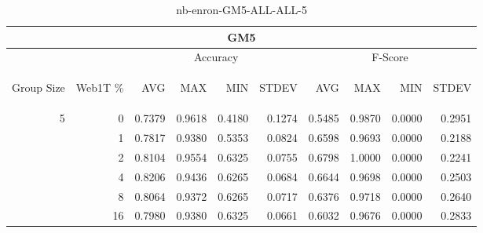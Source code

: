 \begin{center}
\begin{table}[htbp]
\begin{tabular}{ | r | r | r | r | r | r | r | r | r | r |}
\hline
\multicolumn{10}{|c|}{GM5}\\
\hline
 & & \multicolumn{4}{|c|}{Accuracy} & \multicolumn{4}{|c|}{F-Score}\\ \cline{3-10}
\begin{sideways}Group Size\end{sideways} & \begin{sideways}Web1T \%\end{sideways} & \begin{sideways}AVG\end{sideways} & \begin{sideways}MAX\end{sideways} & \begin{sideways}MIN\end{sideways} & \begin{sideways}STDEV\end{sideways} & \begin{sideways}AVG\end{sideways} & \begin{sideways}MAX\end{sideways} & \begin{sideways}MIN\end{sideways} & \begin{sideways}STDEV\end{sideways}\\
\hline
\multirow{6}{*}{5}
 & 0 & 0.7379 & 0.9618 & 0.4180 & 0.1274 & 0.5485 & 0.9870 & 0.0000 & 0.2951\\ \cline{2-10}
 & 1 & 0.7817 & 0.9380 & 0.5353 & 0.0824 & 0.6598 & 0.9693 & 0.0000 & 0.2188\\ \cline{2-10}
 & 2 & 0.8104 & 0.9554 & 0.6325 & 0.0755 & 0.6798 & 1.0000 & 0.0000 & 0.2241\\ \cline{2-10}
 & 4 & 0.8206 & 0.9436 & 0.6265 & 0.0684 & 0.6644 & 0.9698 & 0.0000 & 0.2503\\ \cline{2-10}
 & 8 & 0.8064 & 0.9372 & 0.6265 & 0.0717 & 0.6376 & 0.9718 & 0.0000 & 0.2640\\ \cline{2-10}
 & 16 & 0.7980 & 0.9380 & 0.6325 & 0.0661 & 0.6032 & 0.9676 & 0.0000 & 0.2833\\ \cline{2-10}
\hline
\end{tabular}
\caption{nb-enron-GM5-ALL-ALL-5}
\end{table}
\end{center}

